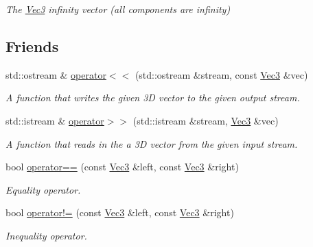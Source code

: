 \begin{DoxyCompactItemize}
\begin{DoxyCompactList}\small\item\em The \hyperlink{classgfxmath_1_1_vec3}{Vec3} infinity vector (all components are infinity) \end{DoxyCompactList}\end{DoxyCompactItemize}
\subsection*{Friends}
\begin{DoxyCompactItemize}
\item 
std\+::ostream \& \hyperlink{classgfxmath_1_1_vec3_a9902784eb40b0c5ee0378e1c2526eb1e}{operator$<$$<$} (std\+::ostream \&stream, const \hyperlink{classgfxmath_1_1_vec3}{Vec3} \&vec)
\begin{DoxyCompactList}\small\item\em A function that writes the given 3\+D vector to the given output stream. \end{DoxyCompactList}\item 
std\+::istream \& \hyperlink{classgfxmath_1_1_vec3_acf645c325558f6e8eabcbad87b4eea50}{operator$>$$>$} (std\+::istream \&stream, \hyperlink{classgfxmath_1_1_vec3}{Vec3} \&vec)
\begin{DoxyCompactList}\small\item\em A function that reads in the a 3\+D vector from the given input stream. \end{DoxyCompactList}\item 
bool \hyperlink{classgfxmath_1_1_vec3_a73bad4468d068dd9b46b313330874c0c}{operator==} (const \hyperlink{classgfxmath_1_1_vec3}{Vec3} \&left, const \hyperlink{classgfxmath_1_1_vec3}{Vec3} \&right)
\begin{DoxyCompactList}\small\item\em Equality operator. \end{DoxyCompactList}\item 
bool \hyperlink{classgfxmath_1_1_vec3_ad5a37b5aca0611e88fb74d9dd01f307a}{operator!=} (const \hyperlink{classgfxmath_1_1_vec3}{Vec3} \&left, const \hyperlink{classgfxmath_1_1_vec3}{Vec3} \&right)
\begin{DoxyCompactList}\small\item\em Inequality operator. \end{DoxyCompactList}\end{DoxyCompactItemize}
